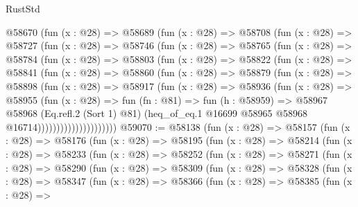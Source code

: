 \begin{lexlean}{RustStd}
\begin{coremodule}
          @58670
            (fun (x : @28) =>
            @58689
              (fun (x : @28) =>
              @58708
                (fun (x : @28) =>
                @58727
                  (fun (x : @28) =>
                  @58746
                    (fun (x : @28) =>
                    @58765
                      (fun (x : @28) =>
                      @58784
                        (fun (x : @28) =>
                        @58803
                          (fun (x : @28) =>
                          @58822
                            (fun (x : @28) =>
                            @58841
                              (fun (x : @28) =>
                              @58860
                                (fun (x : @28) =>
                                @58879
                                  (fun (x : @28) =>
                                  @58898
                                    (fun (x : @28) =>
                                    @58917
                                      (fun (x : @28) =>
                                      @58936
                                        (fun (x : @28) =>
                                        @58955
                                          (fun (x : @28) =>
                                          fun (fn : @81) =>
                                          fun (h : @58959) =>
                                          @58967
                                            @58968
                                            (Eq.refl.{2} (Sort 1) @81)
                                            (heq_of_eq.{1}
                                              @16699
                                              @58965
                                              @58968
                                              @16714)))))))))))))))))))))
@59070 := @58138
    (fun (x : @28) =>
    @58157
      (fun (x : @28) =>
      @58176
        (fun (x : @28) =>
        @58195
          (fun (x : @28) =>
          @58214
            (fun (x : @28) =>
            @58233
              (fun (x : @28) =>
              @58252
                (fun (x : @28) =>
                @58271
                  (fun (x : @28) =>
                  @58290
                    (fun (x : @28) =>
                    @58309
                      (fun (x : @28) =>
                      @58328
                        (fun (x : @28) =>
                        @58347
                          (fun (x : @28) =>
                          @58366
                            (fun (x : @28) =>
                            @58385
                              (fun (x : @28) =>

\end{coremodule}
\end{lexlean}
